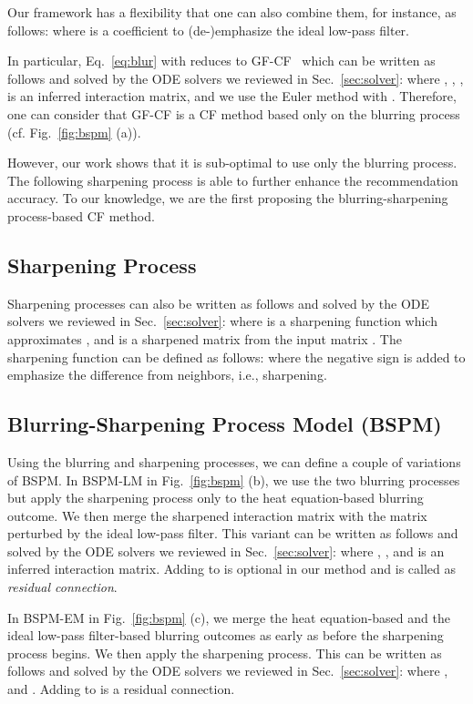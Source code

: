 \documentclass[sigconf,natbib=true]{acmart}
\begin{document}
Our framework has a flexibility that one can also combine them, for instance, as follows:
where  is a coefficient to (de-)emphasize the ideal low-pass filter.

In particular, Eq.~\eqref{eq:blur} with  reduces to GF-CF~\cite{Shen21GFCF} which can be written as follows and solved by the ODE solvers we reviewed in Sec.~\ref{sec:solver}:
where , , ,  is an inferred interaction matrix, and we use the Euler method with . Therefore, one can consider that GF-CF is a CF method based only on the blurring process (cf. Fig.~\ref{fig:bspm} (a)). 

However, our work shows that it is sub-optimal to use only the blurring process. The following sharpening process is able to further enhance the recommendation accuracy. To our knowledge, we are the first proposing the blurring-sharpening process-based CF method.

\subsection{Sharpening Process}
Sharpening processes can also be written as follows and solved by the ODE solvers we reviewed in Sec.~\ref{sec:solver}:
where  is a sharpening function which approximates , and  is a sharpened matrix from the input matrix . The sharpening function  can be defined as follows:
where the negative sign is added to emphasize the difference from neighbors, i.e., sharpening.

\subsection{Blurring-Sharpening Process Model (BSPM)}
Using the blurring and sharpening processes, we can define a couple of variations of BSPM. In BSPM-LM in Fig.~\ref{fig:bspm} (b), we use the two blurring processes but apply the sharpening process only to the heat equation-based blurring outcome. We then merge the sharpened interaction matrix with the matrix perturbed by the ideal low-pass filter. This variant can be written as follows and solved by the ODE solvers we reviewed in Sec.~\ref{sec:solver}:
where , , and  is an inferred interaction matrix. Adding  to  is optional in our method and is called as \emph{residual connection}.

In BSPM-EM in Fig.~\ref{fig:bspm} (c), we merge the heat equation-based and the ideal low-pass filter-based blurring outcomes as early as before the sharpening process begins. We then apply the sharpening process. This can be written as follows and solved by the ODE solvers we reviewed in Sec.~\ref{sec:solver}:
where , and . Adding  to  is a residual connection.
\end{document}
